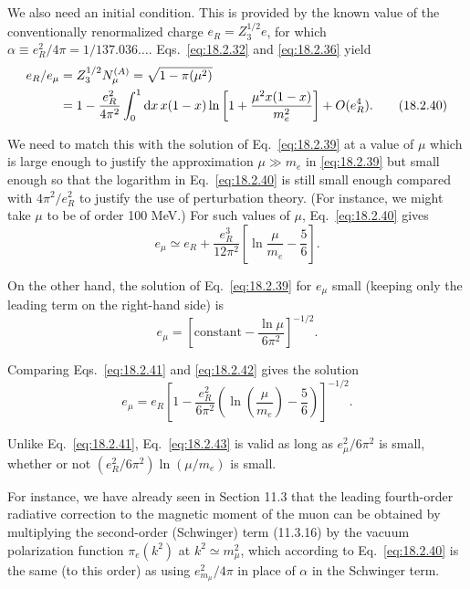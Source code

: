 We also need an initial condition. This is provided by the known value of the
conventionally renormalized charge $e_R=Z_3^{1/2}e$, for which
$\alpha\equiv e_R^2/4\pi=1/137.036\ldots$. Eqs.~\eqref{eq:18.2.32} and
\eqref{eq:18.2.36} yield
\begin{align}
e_R/e_\mu
&=Z_3^{1/2}N_\mu^{(A)}=\sqrt{1-\pi(\mu^2)}\notag\\
&=1-\frac{e_R^2}{4\pi^2}\int_0^1\mathop{}\!\mathrm{d} x\,x(1-x)
\ln\left[1+\frac{\mu^2x(1-x)}{m_e^2}\right]+O(e_R^4).
\tag{18.2.40}\label{eq:18.2.40}
\end{align}
\par\noindent
We need to match this with the solution of Eq.~\eqref{eq:18.2.39} at a value
of $\mu$ which is large enough to justify the approximation $\mu\gg m_e$ in
\eqref{eq:18.2.39} but small enough so that the logarithm in
Eq.~\eqref{eq:18.2.40} is still small enough compared with $4\pi^2/e_R^2$ to
justify the use of perturbation theory. (For instance, we might take $\mu$ to
be of order 100 MeV.) For such values of $\mu$, Eq.~\eqref{eq:18.2.40} gives
\begin{equation}
e_\mu\simeq e_R+\frac{e_R^3}{12\pi^2}
\left[\ln\frac{\mu}{m_e}-\frac{5}{6}\right].
\tag{18.2.41}\label{eq:18.2.41}
\end{equation}
\par\noindent
On the other hand, the solution of Eq.~\eqref{eq:18.2.39} for $e_\mu$ small
(keeping only the leading term on the right-hand side) is
\begin{equation}
e_\mu=\left[\text{constant}-\frac{\ln\mu}{6\pi^2}\right]^{-1/2}.
\tag{18.2.42}\label{eq:18.2.42}
\end{equation}
\par\noindent
Comparing Eqs.~\eqref{eq:18.2.41} and \eqref{eq:18.2.42} gives the solution
\begin{equation}
e_\mu=e_R\left[1-\frac{e_R^2}{6\pi^2}
\left(\ln\left(\frac{\mu}{m_e}\right)-\frac{5}{6}\right)\right]^{-1/2}.
\tag{18.2.43}\label{eq:18.2.43}
\end{equation}
\par\noindent
Unlike Eq.~\eqref{eq:18.2.41}, Eq.~\eqref{eq:18.2.43} is valid as long as
$e_\mu^2/6\pi^2$ is small, whether or not
$(e_R^2/6\pi^2)\allowbreak\ln(\mu/m_e)$ is small.

For instance, we have already seen in Section 11.3 that the leading
fourth-order radiative correction to the magnetic moment of the muon can be
obtained by multiplying the second-order (Schwinger) term (11.3.16)
by the vacuum polarization function $\pi_e(k^2)$ at $k^2\simeq m_\mu^2$,
which according to Eq.~\eqref{eq:18.2.40} is the same (to this order) as using
$e_{m_\mu}^2/4\pi$ in place of $\alpha$ in the Schwinger term.

